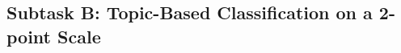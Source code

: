 \documentclass[11pt,a4paper]{article}
\begin{document}


    


\subsection{Subtask B: Topic-Based Classification on a 2-point Scale} 
\end{document}
